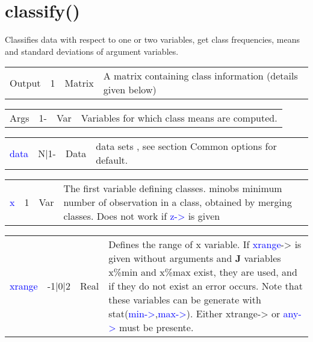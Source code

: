 \section{classify()}
\label{classify}
 Classifies data with respect to one or two variables, get class
  frequencies,
   means and standard deviations of
 argument variables.
\begin{table}[H]
\begin{tabular}{ m{}  m{}m{}p{}}
 Output& 1&Matrix&
 A matrix containing class information (details given below)
\\ \cline{1-4}
\end{tabular}
\end{table}
\vspace{-1.51em}
\begin{table}[H]
\begin{tabular}{ m{}  m{}m{}p{}}
 Args&1-&Var&
 Variables for which class means are computed.

\\ \cline{1-4}
\end{tabular}
\end{table}
\vspace{-1.51em}
\begin{table}[H]
\begin{tabular}{ m{}  m{}m{}p{}}
\textcolor{blue}{data} & N|1- & Data &	data sets , see section Common options for default.
\\ \cline{1-4}
\end{tabular}
\end{table}
\vspace{-1.51em}
\begin{table}[H]
\begin{tabular}{ m{}  m{}m{}p{}}
 \textcolor{blue}{x} &1&Var&The first variable defining classes.
 minobs minimum number of observation in a class, obtained by merging classes. Does
 not work if \textcolor{blue}{z->} is given

\\ \cline{1-4}
\end{tabular}
\end{table}
\vspace{-1.51em}
\begin{table}[H]
\begin{tabular}{ m{}  m{}m{}p{}}
 \textcolor{blue}{xrange}& -1|0|2&Real& Defines the range of x variable. If \textcolor{blue}{xrange}-> is given without
 arguments and \textbf{J} variables x\%min and x\%max exist, they are used, and
 if they do not exist an error occurs. Note that these variables can be
 generate with \textcolor{VioletRed}{stat}(\textcolor{blue}{min->},\textcolor{blue}{max->}). Either xtrange-> or \textcolor{blue}{any->} must be presente.
\\ \cline{1-4}
\end{tabular}
\end{table}
